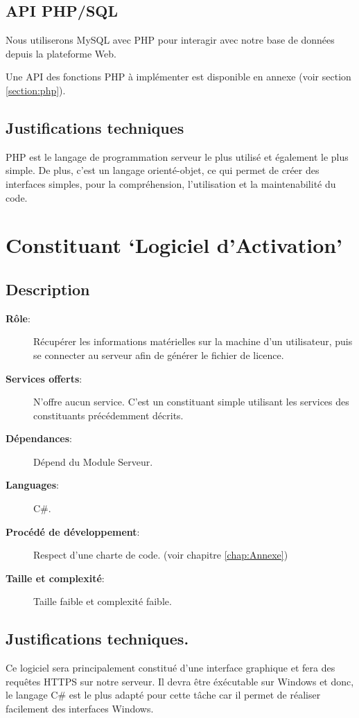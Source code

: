 \subsection{API PHP/SQL}
Nous utiliserons MySQL avec PHP pour interagir avec notre base de données depuis la plateforme Web.

Une API des fonctions PHP à implémenter est disponible en annexe (voir section \ref{section:php}).

\subsection{Justifications techniques}

PHP est le langage de programmation serveur le plus utilisé et également le plus simple.
De plus, c'est un langage orienté-objet, ce qui permet de créer des interfaces simples, pour la
compréhension, l'utilisation et la maintenabilité du code.

\section{Constituant `Logiciel d'Activation'}
\subsection{Description}
\begin{description}
	\item[\textbf{Rôle}:]
		Récupérer les informations matérielles sur la machine d'un utilisateur, puis 
		se connecter au serveur afin de générer le fichier de licence.
	\item[\textbf{Services offerts}:] 
		N'offre aucun service. C'est un constituant simple utilisant les services des
        constituants précédemment décrits.
	\item[\textbf{Dépendances}:]
		Dépend du Module Serveur.
	\item[\textbf{Languages}:]
		C\#.
	\item[\textbf{Procédé de développement}:]
		Respect d'une charte de code. (voir chapitre \ref{chap:Annexe})
	\item[\textbf{Taille et complexité}:]
		Taille faible et complexité faible. 
\end{description}

\subsection{Justifications techniques.}
Ce logiciel sera principalement constitué d'une interface graphique et fera des requêtes HTTPS sur notre serveur.
Il devra être éxécutable sur Windows et donc, le langage C\# est le plus adapté pour cette tâche car il permet de
réaliser facilement des interfaces Windows.

